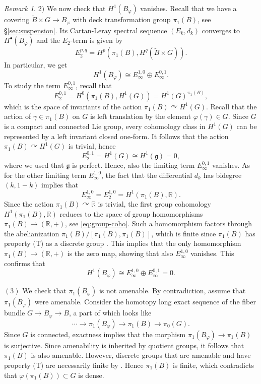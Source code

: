 \documentclass[11pt, letterpaper, oneside,reqno]{amsart}
\theoremstyle{plain}
\theoremstyle{underline}
\theoremstyle{definition}
\theoremstyle{remark}
\newtheorem{remark}[thm]{Remark}
\begin{document}
\begin{remark}
		
		$2)$ We now check that $H^{1}(B_{\varphi})$ vanishes. Recall that we have a covering $\widetilde{B}\times G\rightarrow B_{\varphi}$ with deck transformation group $\pi_1(B)$, see \S\ref{sec:suspension}. Its Cartan-Leray spectral sequence $(E_k,d_k)$ converges to $H^{\bullet}(B_{\varphi})$ and the $E_2$-term is given by \cite[Thm.~$8^{bis}.9$]{Spectral}
		\[
		E_2^{p,q}=H^{p}\left(\pi_1(B),H^{q}(\widetilde{B}\times G)\right).
		\]
		In particular, we get
		\[
		H^{1}(B_{\varphi})\cong E_{\infty}^{1,0}\oplus E_{\infty}^{0,1}.
		\]
		To study the term $E_{\infty}^{0,1}$, recall that
		$$
		E_{2}^{0,1}=H^{0}\left(\pi_1(B),H^{1}(G)\right)=H^{1}(G)^{\pi_1(B)},
		$$
		which is the space of invariants of the action $\pi_1(B)\curvearrowright H^{1}(G)$. Recall that the action of $\gamma\in\pi_1(B)$ on $G$ is left translation by the element $\varphi(\gamma)\in G$. Since $G$ is a compact and connected Lie group, every cohomology class in $H^{1}(G)$ can be represented by a left invariant closed one-form. It follows that the action $\pi_1(B)\curvearrowright H^{1}(G)$ is trivial, hence
		\[
		E_{2}^{0,1}=H^{1}(G)\cong H^{1}(\mathfrak{g})=0,
		\]
		where we used that $\mathfrak{g}$ is perfect. Hence, also the limiting term $E_{\infty}^{0,1}$ vanishes. As for the other limiting term $E_{\infty}^{1,0}$, the fact that the differential $d_k$ has bidegree $(k,1-k)$ implies that
		\[
		E_{\infty}^{1,0}=E_2^{1,0}=H^{1}\left(\pi_1(B),\mathbb{R}\right).
		\]
		Since the action $\pi_1(B)\curvearrowright \mathbb{R}$ is trivial, the first group cohomology $H^{1}\left(\pi_1(B),\mathbb{R}\right)$ reduces to the space of group homomorphisms $\pi_1(B)\rightarrow(\mathbb{R},+)$, see \eqref{eq:group-coho}. Such a homomorphism factors through the abelianization $\pi_1(B)/[\pi_1(B),\pi_1(B)]$, which is finite since  $\pi_1(B)$ has property (T) as a discrete group \cite[Cor.~1.3.6]{Kazhdan}. This implies that the only homomorphism $\pi_1(B)\rightarrow(\mathbb{R},+)$ is the zero map, showing that also $E_{\infty}^{1,0}$ vanishes. This confirms that
		\[
		H^{1}(B_{\varphi})\cong E_{\infty}^{1,0}\oplus E_{\infty}^{0,1}=0.
		\]
		
		$(3)$ We check that $\pi_1(B_{\varphi})$ is not amenable. By contradiction, assume that $\pi_1(B_{\varphi})$ were amenable. Consider the homotopy long exact sequence of the fiber bundle $G\rightarrow B_{\varphi}\rightarrow B$, a part of which looks like
		\[
		\cdots\rightarrow\pi_1(B_{\varphi})\rightarrow\pi_1(B)\rightarrow\pi_{0}(G).
		\]
		Since $G$ is connected, exactness implies that the morphism $\pi_1(B_{\varphi})\rightarrow\pi_1(B)$ is surjective. Since amenability is inherited by quotient groups, it follows that $\pi_1(B)$ is also amenable. However, discrete groups that are amenable and have property (T) are necessarily finite by \cite[Thm.~1.1.6]{Kazhdan}. Hence $\pi_1(B)$ is finite, which contradicts that $\varphi(\pi_1(B))\subset G$ is dense.
	\end{remark}
	
\end{document}
